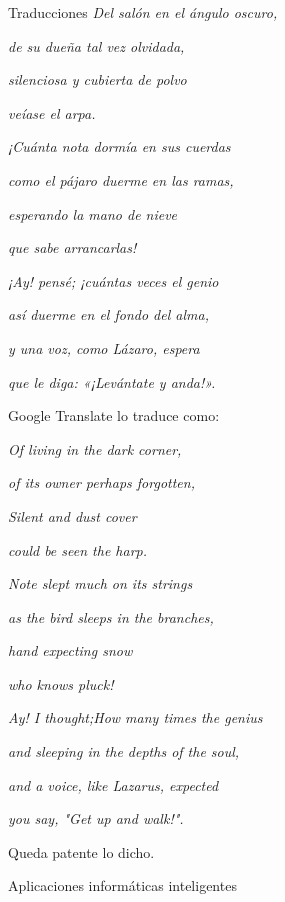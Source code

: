 \documentclass[spanish, a4paper, 12pt]{article} 	%
\begin{document}
\begin{section}{Traducciones}
\textit{Del salón en el ángulo oscuro, 
}	

\textit{de su dueña tal vez olvidada, 
}

\textit{silenciosa y cubierta de polvo 
}

\textit{veíase el arpa. 
}

\textit{¡Cuánta nota dormía en sus cuerdas 
}

\textit{como el pájaro duerme en las ramas, 
}

\textit{esperando la mano de nieve 
}

\textit{que sabe arrancarlas! 
}

\textit{¡Ay! pensé; ¡cuántas veces el genio 
}

\textit{así duerme en el fondo del alma, 
}

\textit{y una voz, como Lázaro, espera 
}

\textit{que le diga: «¡Levántate y anda!».
}

\vspace{0.5cm}

Google Translate lo traduce como: 

\vspace{0.5cm}

\textit{Of living in the dark corner, }

\textit{of its owner perhaps forgotten, }

\textit{Silent and dust cover} 

\textit{could be seen the harp. }

\textit{Note slept much on its strings }

\textit{as the bird sleeps in the branches, }

\textit{hand expecting snow} 

\textit{who knows pluck!} 


\textit{Ay! I thought;How many times the genius }

\textit{and sleeping in the depths of the soul, }

\textit{and a voice, like Lazarus, expected} 

\textit{you say, "Get up and walk!".}
	
\vspace{0.5cm}

Queda patente lo dicho.
	
\end{section}

\begin{section}{Aplicaciones informáticas inteligentes}
	
	
	
\end{section}
\end{document}

